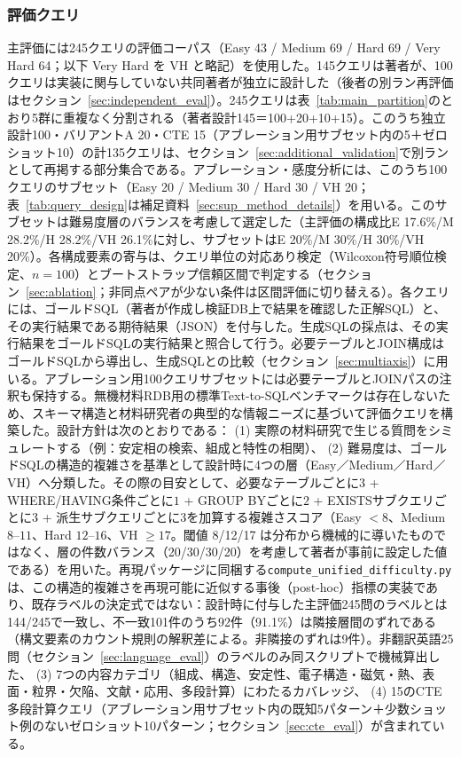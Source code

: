 \documentclass[twocolumn]{interact}
\begin{document}
\subsubsection{評価クエリ}
\label{sec:query_design}

主評価には245クエリの評価コーパス（Easy 43 / Medium 69 / Hard 69 / Very Hard 64；以下 Very Hard を VH と略記）を使用した。145クエリは著者が、100クエリは実装に関与していない共同著者が独立に設計した（後者の別ラン再評価はセクション~\ref{sec:independent_eval}）。245クエリは表~\ref{tab:main_partition}のとおり5群に重複なく分割される（著者設計145＝100+20+10+15）。このうち独立設計100・バリアントA 20・CTE 15（アブレーション用サブセット内の5＋ゼロショット10）の計135クエリは、セクション~\ref{sec:additional_validation}で別ランとして再掲する部分集合である。アブレーション・感度分析には、このうち100クエリのサブセット（Easy 20 / Medium 30 / Hard 30 / VH 20；表~\ref{tab:query_design}は補足資料~\ref{sec:sup_method_details}）を用いる。このサブセットは難易度層のバランスを考慮して選定した（主評価の構成比E 17.6\%/M 28.2\%/H 28.2\%/VH 26.1\%に対し、サブセットはE 20\%/M 30\%/H 30\%/VH 20\%）。各構成要素の寄与は、クエリ単位の対応あり検定（Wilcoxon符号順位検定、$n=100$）とブートストラップ信頼区間で判定する（セクション~\ref{sec:ablation}；非同点ペアが少ない条件は区間評価に切り替える）。各クエリには、ゴールドSQL（著者が作成し検証DB上で結果を確認した正解SQL）と、その実行結果である期待結果（JSON）を付与した。生成SQLの採点は、その実行結果をゴールドSQLの実行結果と照合して行う。必要テーブルとJOIN構成はゴールドSQLから導出し、生成SQLとの比較（セクション~\ref{sec:multiaxis}）に用いる。アブレーション用100クエリサブセットには必要テーブルとJOINパスの注釈も保持する。無機材料RDB用の標準Text-to-SQLベンチマークは存在しないため、スキーマ構造と材料研究者の典型的な情報ニーズに基づいて評価クエリを構築した。設計方針は次のとおりである：
(1) 実際の材料研究で生じる質問をシミュレートする（例：安定相の検索、組成と特性の相関）、
(2) 難易度は、ゴールドSQLの構造的複雑さを基準として設計時に4つの層（Easy／Medium／Hard／VH）へ分類した。その際の目安として、必要なテーブルごとに$3$ + WHERE/HAVING条件ごとに$1$ + GROUP BYごとに$2$ + EXISTSサブクエリごとに$3$ + 派生サブクエリごとに$3$を加算する複雑さスコア（Easy $<8$、Medium $8$--$11$、Hard $12$--$16$、VH $\geq 17$。閾値 8/12/17 は分布から機械的に導いたものではなく、層の件数バランス（20/30/30/20）を考慮して著者が事前に設定した値である）を用いた。再現パッケージに同梱する\texttt{compute\_unified\_difficulty.py}は、この構造的複雑さを再現可能に近似する事後（post-hoc）指標の実装であり、既存ラベルの決定式ではない：設計時に付与した主評価245問のラベルとは144/245で一致し、不一致101件のうち92件（91.1\%）は隣接層間のずれである（構文要素のカウント規則の解釈差による。非隣接のずれは9件）。非翻訳英語25問（セクション~\ref{sec:language_eval}）のラベルのみ同スクリプトで機械算出した、
(3) 7つの内容カテゴリ（組成、構造、安定性、電子構造・磁気・熱、表面・粒界・欠陥、文献・応用、多段計算）にわたるカバレッジ、
(4) 15のCTE多段計算クエリ（アブレーション用サブセット内の既知5パターン＋少数ショット例のないゼロショット10パターン；セクション~\ref{sec:cte_eval}）が含まれている。
\end{document}
